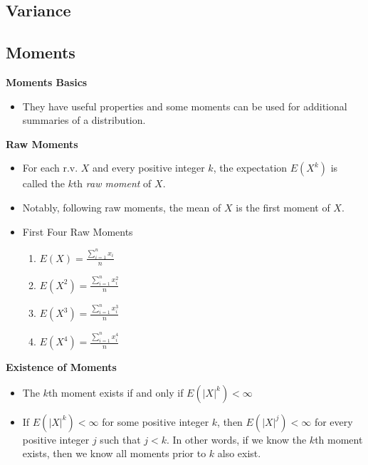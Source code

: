 \documentclass[11pt]{article}
\begin{document}
\subsection{Variance}
\subsection{Moments}
\textbf{Moments Basics}
\begin{itemize}
    \item They have useful properties and some moments can be used for additional summaries of 
    a distribution. 
\end{itemize}

\textbf{Raw Moments}
\begin{itemize}
    \item For each r.v. $X$ and every positive integer $k$, the expectation $E(X^k)$ is called 
    the $k$th \textit{raw moment} of $X$.
    \item Notably, following raw moments, the mean of $X$ is the first moment of $X$.
    \item First Four Raw Moments
    \begin{enumerate}
        \item $E(X)=\frac{\sum_{i=1}^{n} x_i}{n}$
        \item $E(X^2)=\frac{\sum_{i=1}^{n} x_i^2}{n}$
        \item $E(X^3)=\frac{\sum_{i=1}^{n} x_i^3}{n}$
        \item $E(X^4)=\frac{\sum_{i=1}^{n} x_i^4}{n}$
    \end{enumerate}
\end{itemize}

\textbf{Existence of Moments}
\begin{itemize}
    \item The $k$th moment exists if and only if $E({|X|}^k) < \infty$
    \item If $E({|X|}^k) < \infty$ for some positive integer $k$, then $E({|X|}^j) < \infty$ 
    for every positive integer $j$ such that $j < k$. In other words, if we know the $k$th 
    moment exists, then we know all moments prior to $k$ also exist.
\end{itemize}
\end{document}
